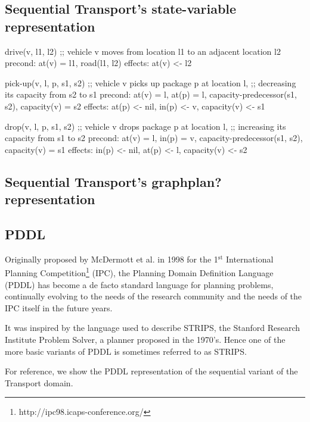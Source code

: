 
\subsection{Sequential Transport's state-variable representation}

\begin{code}
drive(v, l1, l2)
  ;; vehicle v moves from location l1 to an adjacent location l2
  precond: at(v) = l1, road(l1, l2)
  effects: at(v) <- l2

pick-up(v, l, p, s1, s2)
  ;; vehicle v picks up package p at location l,
  ;; decreasing its capacity from s2 to s1
  precond: at(v) = l, at(p) = l, capacity-predecessor(s1, s2),
           capacity(v) = s2
  effects: at(p) <- nil, in(p) <- v, capacity(v) <- s1
  
drop(v, l, p, s1, s2)
  ;; vehicle v drops package p at location l,
  ;; increasing its capacity from s1 to s2
  precond: at(v) = l, in(p) = v, capacity-predecessor(s1, s2),
  		   capacity(v) = s1
  effects: in(p) <- nil, at(p) <- l, capacity(v) <- s2
\end{code}

\subsection{Sequential Transport's graphplan? representation}

\subsection{PDDL}

Originally proposed by McDermott et al. in 1998 for the 1$^{\mathrm{st}}$ International Planning
Competition\footnote{http://ipc98.icaps-conference.org/} (IPC),
the Planning Domain Definition Language\cite{McDermott1998} (PDDL) has become
a de facto standard language for planning problems, continually evolving to the needs of the
research community and the needs of the IPC itself in the future years.

It was inspired by the language used to describe STRIPS,
the Stanford Research Institute Problem Solver\cite{Fikes1971},
a planner proposed in the 1970's. Hence one of the more basic variants of PDDL is sometimes
referred to as STRIPS.

For reference, we show the PDDL representation of the sequential variant of
the Transport domain.


